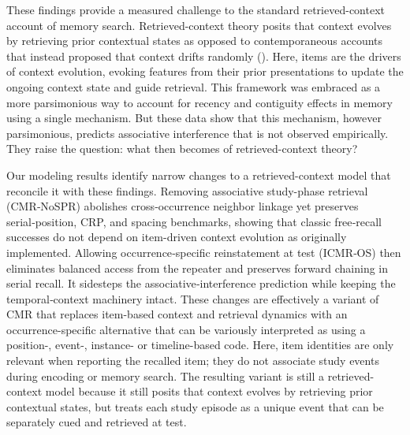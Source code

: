 \documentclass[
  man,
  floatsintext,
  longtable,
  nolmodern,
  notxfonts,
  notimes,
  draftfirst,
  colorlinks=true,linkcolor=blue,citecolor=blue,urlcolor=blue]{apa7}
\begin{document}
These findings provide a measured challenge to the standard
retrieved-context account of memory search. Retrieved-context theory
posits that context evolves by retrieving prior contextual states as
opposed to contemporaneous accounts that instead proposed that context
drifts randomly (). Here, items are the drivers of context evolution, evoking
features from their prior presentations to update the ongoing context
state and guide retrieval. This framework was embraced as a more
parsimonious way to account for recency and contiguity effects in memory
using a single mechanism. But these data show that this mechanism,
however parsimonious, predicts associative interference that is not
observed empirically. They raise the question: what then becomes of
retrieved-context theory?

Our modeling results identify narrow changes to a retrieved-context
model that reconcile it with these findings. Removing associative
study-phase retrieval (CMR‑NoSPR) abolishes cross‑occurrence neighbor
linkage yet preserves serial‑position, CRP, and spacing benchmarks,
showing that classic free‑recall successes do not depend on item-driven
context evolution as originally implemented. Allowing
occurrence‑specific reinstatement at test (ICMR‑OS) then eliminates
balanced access from the repeater and preserves forward chaining in
serial recall. It sidesteps the associative‑interference prediction
while keeping the temporal‑context machinery intact. These changes are
effectively a variant of CMR that replaces item-based context and
retrieval dynamics with an occurrence-specific alternative that can be
variously interpreted as using a position-, event-, instance- or
timeline-based code. Here, item identities are only relevant when
reporting the recalled item; they do not associate study events during
encoding or memory search. The resulting variant is still a
retrieved-context model because it still posits that context evolves by
retrieving prior contextual states, but treats each study episode as a
unique event that can be separately cued and retrieved at test.
\end{document}
